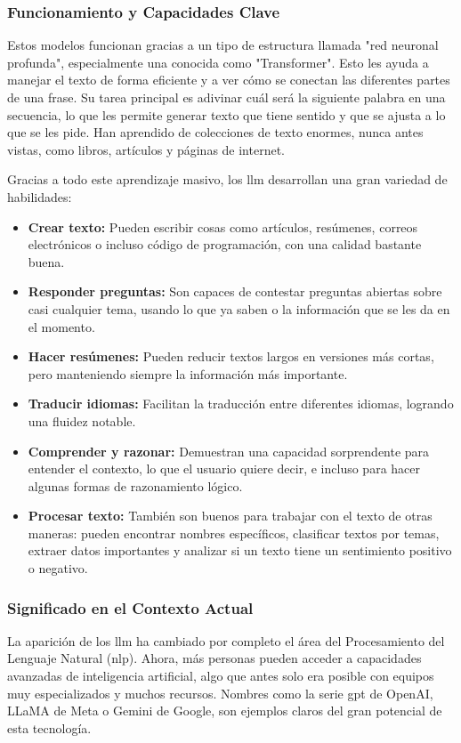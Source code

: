 \subsubsection{Funcionamiento y Capacidades Clave}
Estos modelos funcionan gracias a un tipo de estructura llamada "red neuronal profunda", especialmente una conocida como "Transformer". Esto les ayuda a manejar el texto de forma eficiente y a ver cómo se conectan las diferentes partes de una frase. Su tarea principal es adivinar cuál será la siguiente palabra en una secuencia, lo que les permite generar texto que tiene sentido y que se ajusta a lo que se les pide. Han aprendido de colecciones de texto enormes, nunca antes vistas, como libros, artículos y páginas de internet.

Gracias a todo este aprendizaje masivo, los \gls{llm} desarrollan una gran variedad de habilidades:
\begin{itemize}
    \item \textbf{Crear texto:} Pueden escribir cosas como artículos, resúmenes, correos electrónicos o incluso código de programación, con una calidad bastante buena.
    \item \textbf{Responder preguntas:} Son capaces de contestar preguntas abiertas sobre casi cualquier tema, usando lo que ya saben o la información que se les da en el momento.
    \item \textbf{Hacer resúmenes:} Pueden reducir textos largos en versiones más cortas, pero manteniendo siempre la información más importante.
    \item \textbf{Traducir idiomas:} Facilitan la traducción entre diferentes idiomas, logrando una fluidez notable.
    \item \textbf{Comprender y razonar:} Demuestran una capacidad sorprendente para entender el contexto, lo que el usuario quiere decir, e incluso para hacer algunas formas de razonamiento lógico.
    \item \textbf{Procesar texto:} También son buenos para trabajar con el texto de otras maneras: pueden encontrar nombres específicos, clasificar textos por temas, extraer datos importantes y analizar si un texto tiene un sentimiento positivo o negativo.
\end{itemize}

\subsubsection{Significado en el Contexto Actual}
La aparición de los \gls{llm} ha cambiado por completo el área del Procesamiento del Lenguaje Natural (\gls{nlp}). Ahora, más personas pueden acceder a capacidades avanzadas de inteligencia artificial, algo que antes solo era posible con equipos muy especializados y muchos recursos. Nombres como la serie \gls{gpt} de OpenAI, LLaMA de Meta o Gemini de Google, son ejemplos claros del gran potencial de esta tecnología.

